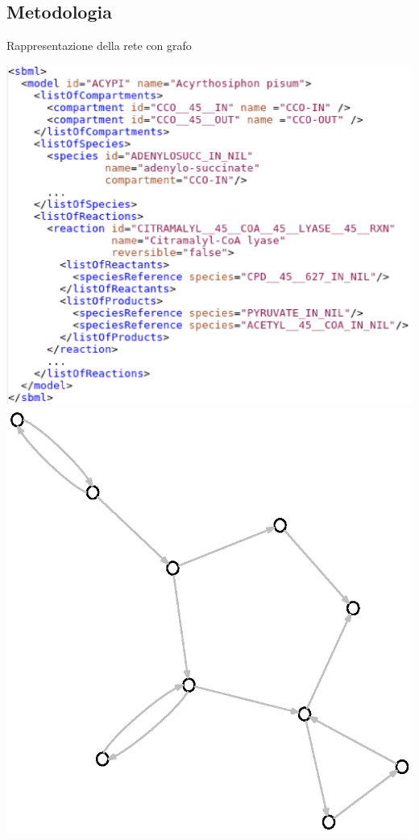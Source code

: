 \documentclass{beamer}
\begin{document}
\subsection{Metodologia}

\begin{frame}{Rappresentazione della rete con grafo}
\begin{center} 
  \includegraphics[scale=.3]{images/sbml-code-chunk.eps}
  \includegraphics[scale=.4]{images/presentation-input-graph-all-whites.eps}
\end{center}
\end{frame}
\end{document}
